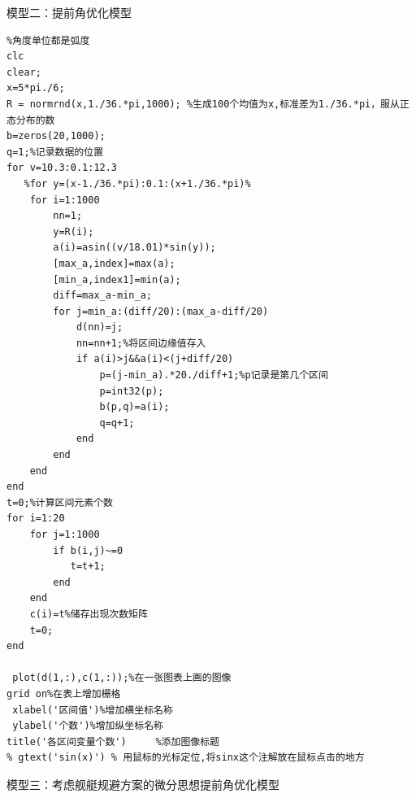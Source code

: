 \documentclass[12pt]{article}%
\begin{document}
模型二：提前角优化模型
\begin{lstlisting}
%角度单位都是弧度
clc
clear;
x=5*pi./6;
R = normrnd(x,1./36.*pi,1000); %生成100个均值为x,标准差为1./36.*pi，服从正态分布的数
b=zeros(20,1000);
q=1;%记录数据的位置
for v=10.3:0.1:12.3
   %for y=(x-1./36.*pi):0.1:(x+1./36.*pi)%
    for i=1:1000
        nn=1;
        y=R(i);
        a(i)=asin((v/18.01)*sin(y));
        [max_a,index]=max(a);
        [min_a,index1]=min(a);
        diff=max_a-min_a;
        for j=min_a:(diff/20):(max_a-diff/20)
            d(nn)=j;
            nn=nn+1;%将区间边缘值存入
            if a(i)>j&&a(i)<(j+diff/20)
                p=(j-min_a).*20./diff+1;%p记录是第几个区间
                p=int32(p);
                b(p,q)=a(i);
                q=q+1;
            end
        end
    end
end
t=0;%计算区间元素个数
for i=1:20
    for j=1:1000
        if b(i,j)~=0
           t=t+1;
        end 
    end
    c(i)=t%储存出现次数矩阵
    t=0;
end

 plot(d(1,:),c(1,:));%在一张图表上画的图像
grid on%在表上增加栅格
 xlabel('区间值')%增加横坐标名称
 ylabel('个数')%增加纵坐标名称
title('各区间变量个数')     %添加图像标题
% gtext('sin(x)') % 用鼠标的光标定位,将sinx这个注解放在鼠标点击的地方

\end{lstlisting}
模型三：考虑舰艇规避方案的微分思想提前角优化模型
\end{document}
